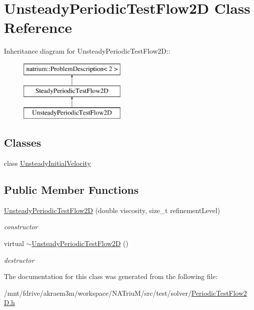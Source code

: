 \hypertarget{classUnsteadyPeriodicTestFlow2D}{
\section{UnsteadyPeriodicTestFlow2D Class Reference}
\label{classUnsteadyPeriodicTestFlow2D}
}
Inheritance diagram for UnsteadyPeriodicTestFlow2D::\begin{figure}[H]
\begin{center}
\leavevmode
\includegraphics[height=3cm]{classUnsteadyPeriodicTestFlow2D}
\end{center}
\end{figure}
\subsection*{Classes}
\begin{DoxyCompactItemize}
\item 
class \hyperlink{classUnsteadyPeriodicTestFlow2D_1_1UnsteadyInitialVelocity}{UnsteadyInitialVelocity}
\end{DoxyCompactItemize}
\subsection*{Public Member Functions}
\begin{DoxyCompactItemize}
\item 
\hypertarget{classUnsteadyPeriodicTestFlow2D_afaf08fa5f1a69e9ed9be9a774ae32773}{
\hyperlink{classUnsteadyPeriodicTestFlow2D_afaf08fa5f1a69e9ed9be9a774ae32773}{UnsteadyPeriodicTestFlow2D} (double viscosity, size\_\-t refinementLevel)}
\label{classUnsteadyPeriodicTestFlow2D_afaf08fa5f1a69e9ed9be9a774ae32773}

\begin{DoxyCompactList}\small\item\em constructor \item\end{DoxyCompactList}\item 
\hypertarget{classUnsteadyPeriodicTestFlow2D_a45558f2ef5811d544b3b7b8d2893a35d}{
virtual \hyperlink{classUnsteadyPeriodicTestFlow2D_a45558f2ef5811d544b3b7b8d2893a35d}{$\sim$UnsteadyPeriodicTestFlow2D} ()}
\label{classUnsteadyPeriodicTestFlow2D_a45558f2ef5811d544b3b7b8d2893a35d}

\begin{DoxyCompactList}\small\item\em destructor \item\end{DoxyCompactList}\end{DoxyCompactItemize}


The documentation for this class was generated from the following file:\begin{DoxyCompactItemize}
\item 
/mnt/fdrive/akraem3m/workspace/NATriuM/src/test/solver/\hyperlink{PeriodicTestFlow2D_8h}{PeriodicTestFlow2D.h}\end{DoxyCompactItemize}
